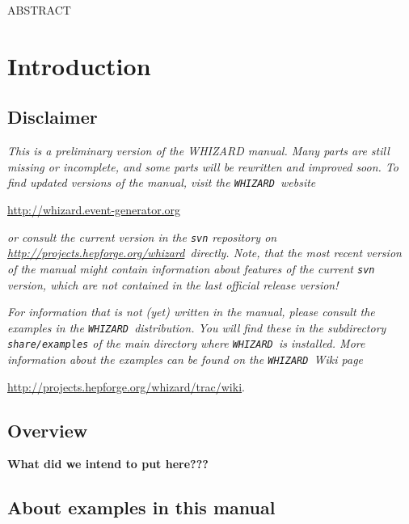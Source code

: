 \documentclass[12pt]{book}
\makeatletter
\newcommand{\whizardpage}{\url{http://whizard.event-generator.org}}
\newcommand{\hepforgepage}{\url{http://projects.hepforge.org/whizard}}
\newcommand{\whizardwiki}{\url{http://projects.hepforge.org/whizard/trac/wiki}}
\newif\if@preliminary
\newcommand\abstractname{ABSTRACT}
\newlength\preprintnoskip
\newlength\abstractwidth
\renewcommand\maketitle{\begin{titlepage}%
  \let\footnotesize\small
  \hfill\parbox{\preprintnoskip}{%
  \begin{flushright}\@preprintno\end{flushright}}\hspace*{1cm}
  \vskip 60\p@
  \begin{center}%
    {\Large\bf\boldmath \@title \par}\vskip 1cm%
    {\sc\@author \par}\vskip 3mm%
    {\@address \par}%
    \if@preliminary
      \vskip 2cm {\large\sf PRELIMINARY DRAFT \par \@date}%
    \fi
  \end{center}\par
  \@thanks
  \vfill
  \begin{center}%
    \parbox{\abstractwidth}{\centerline{\abstractname}%
    \vskip 3mm%
    \@abstract}
  \end{center}
  \end{titlepage}%
  \setcounter{footnote}{0}%
  \let\thanks\relax\let\maketitle\relax
  \gdef\@thanks{}\gdef\@author{}\gdef\@address{}%
  \gdef\@title{}\gdef\@abstract{}\gdef\@preprintno{}
}%
\newcommand{\whizard}{\texttt{WHIZARD}}
\makeatother
\begin{document}
%
\maketitle


\tableofcontents

\newpage
\chapter{Introduction}

\section{Disclaimer}

\emph{This is a preliminary version of the WHIZARD manual.  Many parts
  are still missing or incomplete, and some parts will be rewritten and
  improved soon.  To find updated versions of the manual,
  visit the \whizard\ website}
\begin{center}
  \whizardpage
\end{center}
\emph{or consult the current version in the \texttt{svn} repository
  on \hepforgepage\ directly. Note, that the most recent version of
  the manual might contain information about features of the
  current \texttt{svn} version, which are not contained in the last
  official release version!}  

\emph{For information that is not (yet) written in the manual, please
consult the examples in the \whizard\ distribution.  You will find these in
the subdirectory \texttt{share/examples} of the main directory where
\whizard\ is installed. More information about the examples can be
found on the \whizard\ Wiki page}
\begin{center}
  \whizardwiki . 
\end{center}

\clearpage
\section{Overview}

{\bf What did we intend to put here???}

\section{About examples in this manual}
\end{document}
